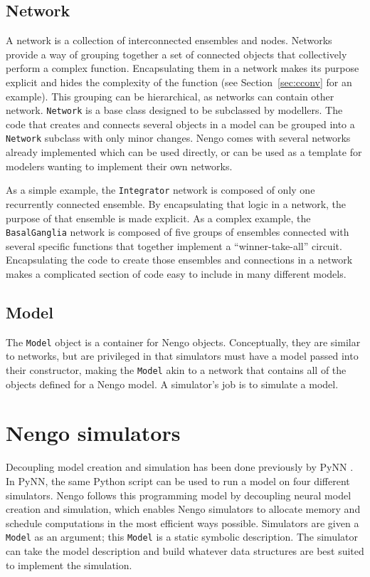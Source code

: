 \documentclass{frontiersSCNS}
\begin{document}
\subsection{Network}

A network is a collection of interconnected ensembles and nodes.
Networks provide a way of grouping together
a set of connected objects
that collectively perform a complex function.
Encapsulating them in a network
makes its purpose explicit
and hides the complexity of the function
(see Section~\ref{sec:cconv} for an example).
This grouping can be hierarchical,
as networks can contain other network.
\texttt{Network} is a base class designed to be
subclassed by modellers.
The code that creates and connects
several objects in a model can be
grouped into a \texttt{Network} subclass
with only minor changes.
Nengo comes with several networks already implemented
which can be used directly,
or can be used as a template
for modelers wanting to implement their own networks.

As a simple example, the \texttt{Integrator} network
is composed of only one recurrently connected ensemble.
By encapsulating that logic in a network,
the purpose of that ensemble is made explicit.
As a complex example,
the \texttt{BasalGanglia} network
is composed of five groups of ensembles
connected with several specific functions
that together implement a ``winner-take-all'' circuit.
Encapsulating the code to create those ensembles
and connections in a network
makes a complicated section of code
easy to include in many different models.

\subsection{Model}

The \texttt{Model} object is a container
for Nengo objects.
Conceptually, they are similar to networks,
but are privileged in that
simulators must have a model
passed into their constructor,
making the \texttt{Model} akin
to a network that contains
all of the objects defined for a Nengo model.
A simulator's job is to simulate a model.

\section{Nengo simulators} \label{sec:simulators}

Decoupling model creation and simulation
has been done previously
by PyNN \citep{davison2008}.
In PyNN, the same Python script
can be used to run a model
on four different simulators.
Nengo follows this programming model by
decoupling neural model creation and simulation,
which enables Nengo simulators
to allocate memory and schedule computations
in the most efficient ways possible.
Simulators are given a \texttt{Model}
as an argument;
this \texttt{Model} is a static symbolic description.
The simulator can take the model description
and build whatever data structures
are best suited to implement the simulation.
\end{document}
